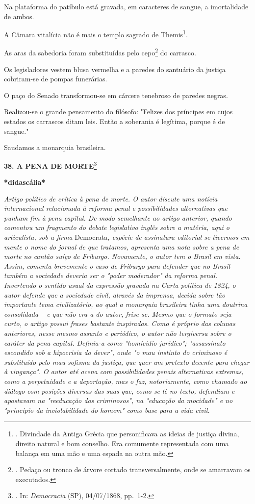 Na plataforma do patíbulo está gravada, em caracteres de sangue, a
imortalidade de ambos.

A Câmara vitalícia não é mais o templo sagrado de Themis\footnote{.
  Divindade da Antiga Grécia que personificava as ideias de justiça
  divina, direito natural e bom conselho. Era comumente representada com
  uma balança em uma mão e uma espada na outra mão.}.

As aras da sabedoria foram substituídas pelo cepo\footnote{. Pedaço ou
  tronco de árvore cortado transversalmente, onde se amarravam os
  executados.} do carrasco.

Os legisladores vestem blusa vermelha e a paredes do santuário da
justiça cobriram-se de pompas funerárias.

O paço do Senado transformou-se em cárcere tenebroso de paredes negras.

Realizou-se o grande pensamento do filósofo: "Felizes dos príncipes em
cujos estados os carrascos ditam leis. Então a soberania é legítima,
porque é de sangue."

Saudamos a monarquia brasileira.

\textbf{38. A PENA DE MORTE}\footnote{. In: \emph{Democracia} (SP),
  04/07/1868, pp.~1-2.}

\textbf{*didascália*}

\emph{Artigo político de crítica à pena de morte. O autor discute uma
notícia internacional relacionada à reforma penal e possibilidades
alternativas que punham fim à pena capital. De modo semelhante ao artigo
anterior, quando comentou um fragmento do debate legislativo inglês
sobre a matéria, aqui o articulista, sob a firma} Democrata\emph{,
espécie de assinatura editorial se tivermos em mente o nome do jornal de
que tratamos, apresenta uma nota sobre a pena de morte no cantão suíço
de Friburgo. Novamente, o autor tem o Brasil em vista. Assim, comenta
brevemente o caso de Friburgo para defender que no Brasil também a
sociedade deveria ser o "poder moderador" da reforma penal. Invertendo o
sentido usual da expressão gravada na Carta política de 1824, o autor
defende que a sociedade civil, através da imprensa, decida sobre tão
importante tema civilizatório, ao qual a monarquia brasileira tinha uma
doutrina consolidada -- e que não era a do autor, frise-se. Mesmo que o
formato seja curto, o artigo possui frases bastante inspiradas. Como é
próprio das colunas anteriores, nesse mesmo assunto e periódico, o autor
não tergiversa sobre o caráter da pena capital. Definia-a como
"homicídio jurídico"; "assassinato escondido sob a hipocrisia do dever",
onde "o mau instinto do criminoso é substituído pelo mau sofisma da
justiça, que quer um pretexto decente para chegar à vingança". O autor
até acena com possibilidades penais alternativas extremas, como a
perpetuidade e a deportação, mas o faz, notoriamente, como chamado ao
diálogo com posições diversas das suas que, como se lê no texto,
defendiam e apostavam na "reeducação dos criminosos", na "educação da
mocidade" e no "princípio da inviolabilidade do homem" como base para a
vida civil.}

